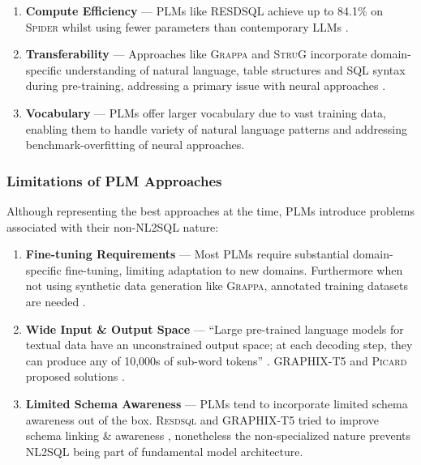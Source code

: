 \begin{enumerate}
    \item \textbf{Compute Efficiency} — PLMs like \textsc{RESDSQL} achieve up
        to 84.1\% on \textsc{Spider} whilst using fewer parameters than
        contemporary LLMs \citep{RESDSQL}.
    \item \textbf{Transferability} — Approaches like \textsc{Grappa} and
        \textsc{StruG} incorporate domain-specific understanding of natural
        language, table structures and SQL syntax during pre-training, addressing
        a primary issue with neural approaches \citep{GRAPPA, STRUG}.
    \item \textbf{Vocabulary} — PLMs offer larger vocabulary due to vast
        training data, enabling them to handle variety of natural language
        patterns and addressing benchmark-overfitting of neural approaches.
\end{enumerate}

\subsubsection{Limitations of PLM Approaches}

Although representing the best approaches at the time, PLMs introduce problems
associated with their non-NL2SQL nature:

\begin{enumerate}
    \item \textbf{Fine-tuning Requirements} — Most PLMs require substantial
        domain-specific fine-tuning, limiting adaptation to new domains.
        Furthermore when not using synthetic data generation like
        \textsc{Grappa}, annotated training datasets are needed \citep{GRAPPA}.
    \item \textbf{Wide Input \& Output Space} — ``Large pre-trained language
        models for textual data have an unconstrained output space; at each
        decoding step, they can produce any of 10,000s of sub-word tokens''
        \citep{PICARD}. GRAPHIX-T5 and \textsc{Picard} proposed solutions
        \citep{GRAPHIX, PICARD}.
    \item \textbf{Limited Schema Awareness} — PLMs tend to incorporate limited
        schema awareness out of the box. \textsc{Resdsql} and GRAPHIX-T5 tried
        to improve schema linking \& awareness \citep{RESDSQL, GRAPHIX},
        nonetheless the non-specialized nature prevents NL2SQL being part of
        fundamental model architecture.
\end{enumerate}


